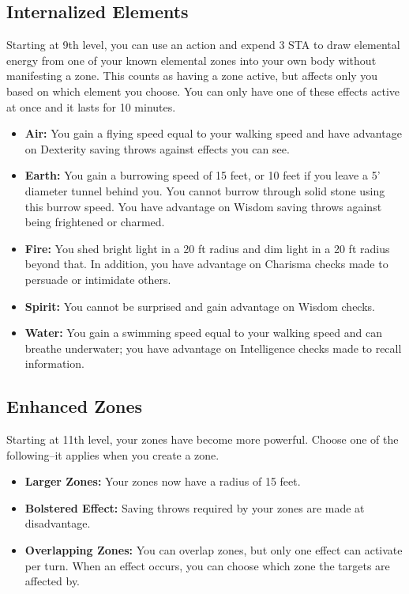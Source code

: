 \subsection{Internalized Elements}
Starting at 9th level, you can use an action and expend 3 STA to draw elemental energy from one of your known elemental zones into your own body without manifesting a zone. This counts as having a zone active, but affects only you based on which element you choose. You can only have one of these effects active at once and it lasts for 10 minutes.
\begin{itemize}
  \item \textbf{Air:} You gain a flying speed equal to your walking speed and have advantage on Dexterity saving throws against effects you can see.
  \item \textbf{Earth:} You gain a burrowing speed of 15 feet, or 10 feet if you leave a 5' diameter tunnel behind you. You cannot burrow through solid stone using this burrow speed. You have advantage on Wisdom saving throws against being frightened or charmed.
  \item \textbf{Fire:} You shed bright light in a 20 ft radius and dim light in a 20 ft radius beyond that. In addition, you have advantage on Charisma checks made to persuade or intimidate others.
  \item \textbf{Spirit:} You cannot be surprised and gain advantage on Wisdom checks.
  \item \textbf{Water:} You gain a swimming speed equal to your walking speed and can breathe underwater; you have advantage on Intelligence checks made to recall information.
\end{itemize}

\subsection{Enhanced Zones}
Starting at 11th level, your zones have become more powerful. Choose one of the following--it applies when you create a zone.
\begin{itemize}
  \item \textbf{Larger Zones:} Your zones now have a radius of 15 feet.
  \item \textbf{Bolstered Effect:} Saving throws required by your zones are made at disadvantage.
  \item \textbf{Overlapping Zones:} You can overlap zones, but only one effect can activate per turn. When an effect occurs, you can choose which zone the targets are affected by.
\end{itemize}

